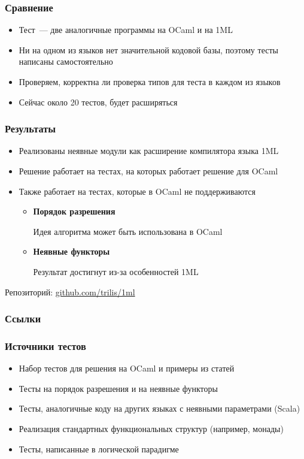 \documentclass{beamer}
\newcommand{\backupbegin}{
   \newcounter{framenumberappendix}
   \setcounter{framenumberappendix}{\value{framenumber}}
}
\begin{document}
\begin{frame}\frametitle{Сравнение}
\begin{itemize}
  \item Тест~--- две аналогичные программы на OCaml и на 1ML
  \item Ни на одном из языков нет значительной кодовой базы, поэтому тесты написаны самостоятельно
  \item Проверяем, корректна ли проверка типов для теста в каждом из языков
  \item Сейчас около 20 тестов, будет расширяться
\end{itemize}
\end{frame}

\begin{frame}\frametitle{Результаты}
\begin{itemize}
    \item Реализованы неявные модули как расширение компилятора языка 1ML
    \item Решение работает на тестах, на которых работает решение для OCaml
    \item Также работает на тестах, которые в OCaml не поддерживаются
    \begin{itemize}
        \item \textbf{Порядок разрешения}

        Идея алгоритма может быть использована в OCaml
        \item \textbf{Неявные функторы}

        Результат достигнут из-за особенностей 1ML
    \end{itemize}
\end{itemize}
Репозиторий: \url{github.com/trilis/1ml}
\end{frame}

\appendix
\backupbegin

\begin{frame}\frametitle{Ссылки}
\printbibliography
\end{frame}

\begin{frame}\frametitle{Источники тестов}
  \begin{itemize}
    \item Набор тестов для решения на OCaml и примеры из статей
    \item Тесты на порядок разрешения и на неявные функторы
    \item Тесты, аналогичные коду на других языках с неявными параметрами (Scala)
    \item Реализация стандартных функциональных структур (например, монады)
    \item Тесты, написанные в логической парадигме
  \end{itemize}
\end{frame}
\end{document}
